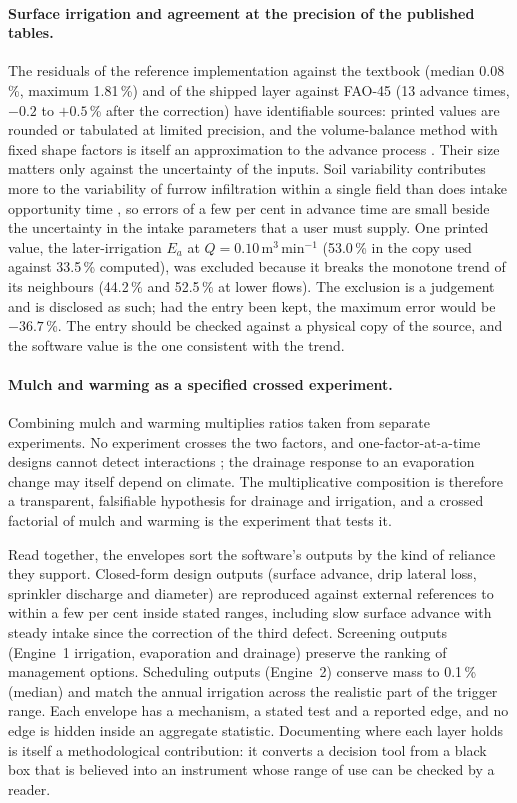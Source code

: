 \paragraph{Surface irrigation and agreement at the precision of the published tables.} The residuals of the reference implementation against the textbook (median 0.08\,\%, maximum 1.81\,\%) and of the shipped layer against FAO-45 (13 advance times, $-0.2$ to $+0.5$\,\% after the correction) have identifiable sources: printed values are rounded or tabulated at limited precision, and the volume-balance method with fixed shape factors is itself an approximation to the advance process \citep{Walker1987,Elliott1982}. Their size matters only against the uncertainty of the inputs. Soil variability contributes more to the variability of furrow infiltration within a single field than does intake opportunity time \citep{Childs1993}, so errors of a few per cent in advance time are small beside the uncertainty in the intake parameters that a user must supply. One printed value, the later-irrigation $E_a$ at $Q=0.10$\,m$^3$\,min$^{-1}$ (53.0\,\% in the copy used against 33.5\,\% computed), was excluded because it breaks the monotone trend of its neighbours (44.2\,\% and 52.5\,\% at lower flows). The exclusion is a judgement and is disclosed as such; had the entry been kept, the maximum error would be $-36.7$\,\%. The entry should be checked against a physical copy of the source, and the software value is the one consistent with the trend.

\paragraph{Mulch and warming as a specified crossed experiment.} Combining mulch and warming multiplies ratios taken from separate experiments. No experiment crosses the two factors, and one-factor-at-a-time designs cannot detect interactions \citep{Saltelli2008}; the drainage response to an evaporation change may itself depend on climate. The multiplicative composition is therefore a transparent, falsifiable hypothesis for drainage and irrigation, and a crossed factorial of mulch and warming is the experiment that tests it.

Read together, the envelopes sort the software's outputs by the kind of reliance they support. Closed-form design outputs (surface advance, drip lateral loss, sprinkler discharge and diameter) are reproduced against external references to within a few per cent inside stated ranges, including slow surface advance with steady intake since the correction of the third defect. Screening outputs (Engine~1 irrigation, evaporation and drainage) preserve the ranking of management options. Scheduling outputs (Engine~2) conserve mass to 0.1\,\% (median) and match the annual irrigation across the realistic part of the trigger range. Each envelope has a mechanism, a stated test and a reported edge, and no edge is hidden inside an aggregate statistic. Documenting where each layer holds is itself a methodological contribution: it converts a decision tool from a black box that is believed into an instrument whose range of use can be checked by a reader.

